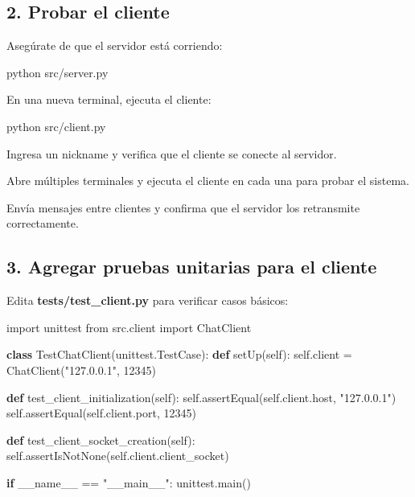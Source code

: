 \documentclass[
  a4paper,
  DIV=11,
  numbers=noendperiod,
  onepage,
  openany]{scrreprt}
\newenvironment{Shaded}{\begin{snugshade}}{\end{snugshade}}
\newcommand{\ControlFlowTok}[1]{\textcolor[rgb]{0.00,0.23,0.31}{\textbf{#1}}}
\newcommand{\DecValTok}[1]{\textcolor[rgb]{0.68,0.00,0.00}{#1}}
\newcommand{\ExtensionTok}[1]{\textcolor[rgb]{0.00,0.23,0.31}{#1}}
\newcommand{\ImportTok}[1]{\textcolor[rgb]{0.00,0.46,0.62}{#1}}
\newcommand{\KeywordTok}[1]{\textcolor[rgb]{0.00,0.23,0.31}{\textbf{#1}}}
\newcommand{\NormalTok}[1]{\textcolor[rgb]{0.00,0.23,0.31}{#1}}
\newcommand{\OperatorTok}[1]{\textcolor[rgb]{0.37,0.37,0.37}{#1}}
\newcommand{\StringTok}[1]{\textcolor[rgb]{0.13,0.47,0.30}{#1}}
\newcommand{\VariableTok}[1]{\textcolor[rgb]{0.07,0.07,0.07}{#1}}
\begin{document}
\subsection{2. Probar el cliente}\label{probar-el-cliente}

Asegúrate de que el servidor está corriendo:

\begin{Shaded}
\begin{Highlighting}[]
\ExtensionTok{python}\NormalTok{ src/server.py}
\end{Highlighting}
\end{Shaded}

En una nueva terminal, ejecuta el cliente:

\begin{Shaded}
\begin{Highlighting}[]
\ExtensionTok{python}\NormalTok{ src/client.py}
\end{Highlighting}
\end{Shaded}

Ingresa un nickname y verifica que el cliente se conecte al servidor.

Abre múltiples terminales y ejecuta el cliente en cada una para probar
el sistema.

Envía mensajes entre clientes y confirma que el servidor los retransmite
correctamente.

\subsection{3. Agregar pruebas unitarias para el
cliente}\label{agregar-pruebas-unitarias-para-el-cliente}

Edita \textbf{tests/test\_client.py} para verificar casos básicos:

\begin{Shaded}
\begin{Highlighting}[]
\ImportTok{import}\NormalTok{ unittest}
\ImportTok{from}\NormalTok{ src.client }\ImportTok{import}\NormalTok{ ChatClient}


\KeywordTok{class}\NormalTok{ TestChatClient(unittest.TestCase):}
    \KeywordTok{def}\NormalTok{ setUp(}\VariableTok{self}\NormalTok{):}
        \VariableTok{self}\NormalTok{.client }\OperatorTok{=}\NormalTok{ ChatClient(}\StringTok{"127.0.0.1"}\NormalTok{, }\DecValTok{12345}\NormalTok{)}

    \KeywordTok{def}\NormalTok{ test\_client\_initialization(}\VariableTok{self}\NormalTok{):}
        \VariableTok{self}\NormalTok{.assertEqual(}\VariableTok{self}\NormalTok{.client.host, }\StringTok{"127.0.0.1"}\NormalTok{)}
        \VariableTok{self}\NormalTok{.assertEqual(}\VariableTok{self}\NormalTok{.client.port, }\DecValTok{12345}\NormalTok{)}

    \KeywordTok{def}\NormalTok{ test\_client\_socket\_creation(}\VariableTok{self}\NormalTok{):}
        \VariableTok{self}\NormalTok{.assertIsNotNone(}\VariableTok{self}\NormalTok{.client.client\_socket)}


\ControlFlowTok{if} \VariableTok{\_\_name\_\_} \OperatorTok{==} \StringTok{"\_\_main\_\_"}\NormalTok{:}
\NormalTok{    unittest.main()}
\end{Highlighting}
\end{Shaded}
\end{document}

